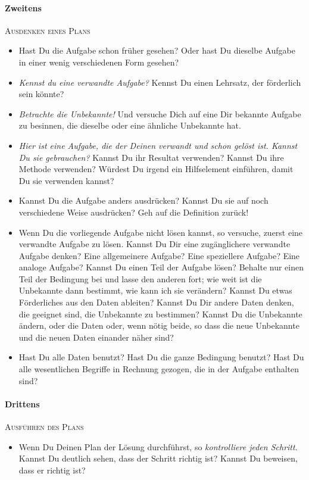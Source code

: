 \paragraph{Zweitens}\textsc{Ausdenken eines Plans}
\begin{itemize}
  \renewcommand{\itemsep}{-0.5ex}
  \item Hast Du die Aufgabe schon früher gesehen? Oder hast Du dieselbe Aufgabe in einer
        wenig verschiedenen Form gesehen?
  \item \textit{Kennst du eine verwandte Aufgabe?} Kennst Du einen Lehrsatz, der förderlich
        sein könnte?
  \item \textit{Betrachte die Unbekannte!} Und versuche Dich auf eine Dir bekannte Aufgabe
        zu besinnen, die dieselbe oder eine ähnliche Unbekannte hat.
  \item \textit{Hier ist eine Aufgabe, die der Deinen verwandt und schon gelöst ist. Kannst Du sie
        gebrauchen?} Kannst Du ihr Resultat verwenden? Kannst Du ihre Methode verwenden?
        Würdest Du irgend ein Hilfselement einführen, damit Du sie verwenden kannst?
  \item Kannst Du die Aufgabe anders ausdrücken? Kannst Du sie auf noch verschiedene Weise
        ausdrücken? Geh auf die Definition zurück!
  \item Wenn Du die vorliegende Aufgabe nicht lösen kannst, so versuche, zuerst eine verwandte
        Aufgabe zu lösen. Kannst Du Dir eine zugänglichere verwandte Aufgabe denken? Eine
        allgemeinere Aufgabe? Eine speziellere Aufgabe? Eine analoge Aufgabe? Kannst Du einen Teil
        der Aufgabe lösen? Behalte nur einen Teil der Bedingung bei und lasse den anderen fort; wie
        weit ist die Unbekannte dann bestimmt, wie kann ich sie verändern? Kannst Du etwas
        Förderliches aus den Daten ableiten? Kannst Du Dir andere Daten denken, die geeignet sind,
        die Unbekannte zu bestimmen? Kannst Du die Unbekannte ändern, oder die Daten oder, wenn
        nötig beide, so dass die neue Unbekannte und die neuen Daten einander näher sind?
  \item Hast Du alle Daten benutzt? Hast Du die ganze Bedingung benutzt? Hast Du alle wesentlichen
        Begriffe in Rechnung gezogen, die in der Aufgabe enthalten sind?
\end{itemize}

\paragraph{Drittens}\textsc{Ausführen des Plans}
\begin{itemize}
  \renewcommand{\itemsep}{-0.5ex}
  \item Wenn Du Deinen Plan der Lösung durchführst, so \textit{kontrolliere jeden Schritt}. Kannst
        Du deutlich sehen, dass der Schritt richtig ist? Kannst Du beweisen, dass er richtig ist?
\end{itemize}

